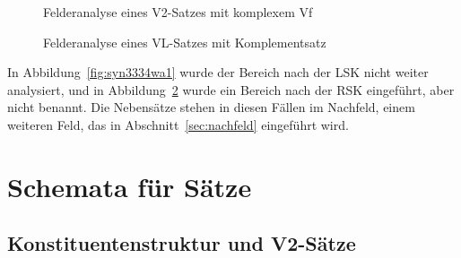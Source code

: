 \begin{figure}
  \centering
  \caption{Felderanalyse eines V2-Satzes mit komplexem Vf}
  \label{fig:syn3334wb1}
\end{figure}

\begin{figure}
  \centering
  \caption{Felderanalyse eines VL-Satzes mit Komplementsatz}
  \label{fig:syn3334wb2}
\end{figure}

In Abbildung~\ref{fig:syn3334wa1} wurde der Bereich nach der LSK nicht weiter analysiert, und in Abbildung~\ref{fig:syn3334wb2} wurde ein Bereich nach der RSK eingeführt, aber nicht benannt.
Die Nebensätze stehen in diesen Fällen im Nachfeld, einem weiteren Feld, das in Abschnitt~\ref{sec:nachfeld} eingeführt wird.



\section{Schemata für Sätze}

\label{sec:satzschemata}
\label{sec:verbzweitsatz}

\subsection{Konstituentenstruktur und V2-Sätze}

\label{sec:konstituentenstrukturinv2}

